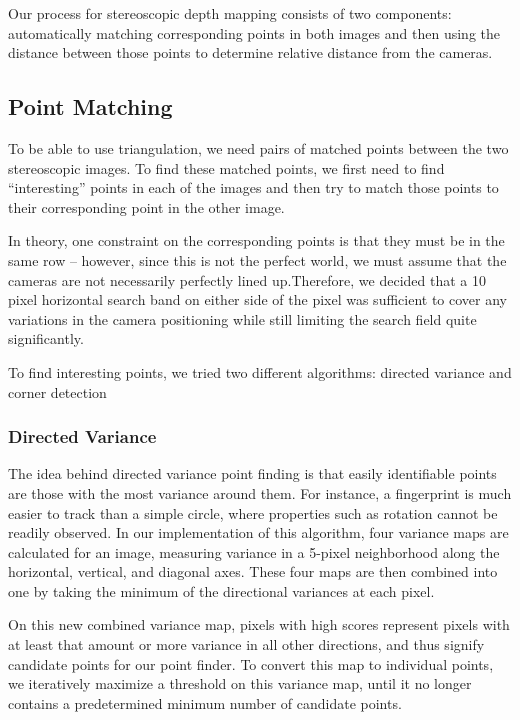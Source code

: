 Our process for stereoscopic depth mapping consists of two components: automatically matching corresponding points in both images and then using the distance between those points to determine relative distance from the cameras. 

\subsection{Point Matching}
To be able to use triangulation, we need pairs of matched points between the two stereoscopic images. To find these matched points, we first need to find ``interesting'' points in each of the images and then try to match those points to their corresponding point in the other image. 

In theory, one constraint on the corresponding points is that they must be in the same row -- however, since this is not the perfect world, we must assume that the cameras are not necessarily perfectly lined up.Therefore, we decided that a 10 pixel horizontal search band on either side of the pixel was sufficient to cover any variations in the camera positioning while still limiting the search field quite significantly. 

To find interesting points, we tried two different algorithms: directed variance and corner detection

\subsubsection{Directed Variance}
The idea behind directed variance point finding is that easily identifiable points are those with the most variance around them. For instance, a fingerprint is much easier to track than a simple circle, where properties such as rotation cannot be readily observed. In our implementation of this algorithm, four variance maps are calculated for an image, measuring variance in a 5-pixel neighborhood along the horizontal, vertical, and diagonal axes. These four maps are then combined into one by taking the minimum of the directional variances at each pixel.

On this new combined variance map, pixels with high scores represent pixels with at least that amount or more variance in all other directions, and thus signify candidate points for our point finder. To convert this map to individual points, we iteratively maximize a threshold on this variance map, until it no longer contains a predetermined minimum number of candidate points.

